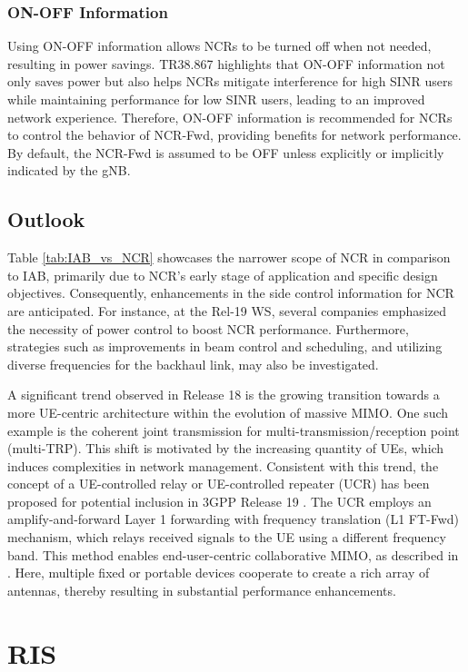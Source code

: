\documentclass[lettersize,journal]{IEEEtran}
\begin{document}
\subsubsection{ON-OFF Information}
Using ON-OFF information allows NCRs to be turned off when not needed, resulting in power savings. TR38.867 \cite{R1-2203237} highlights that ON-OFF information not only saves power but also helps NCRs mitigate interference for high SINR users while maintaining performance for low SINR users, leading to an improved network experience. Therefore, ON-OFF information is recommended for NCRs to control the behavior of NCR-Fwd, providing benefits for network performance. By default, the NCR-Fwd is assumed to be OFF unless explicitly or implicitly indicated by the gNB.


\subsection{Outlook}

Table \ref{tab:IAB_vs_NCR} showcases the narrower scope of NCR in comparison to IAB, primarily due to NCR's early stage of application and specific design objectives. Consequently, enhancements in the side control information for NCR are anticipated. For instance, at the Rel-19 WS, several companies emphasized the necessity of power control to boost NCR performance. Furthermore, strategies such as improvements in beam control and scheduling, and utilizing diverse frequencies for the backhaul link, may also be investigated.

A significant trend observed in Release 18 is the growing transition towards a more UE-centric architecture within the evolution of massive MIMO. One such example is the coherent joint transmission for multi-transmission/reception point (multi-TRP). This shift is motivated by the increasing quantity of UEs, which induces complexities in network management. Consistent with this trend, the concept of a UE-controlled relay or UE-controlled repeater (UCR) has been proposed for potential inclusion in 3GPP Release 19 \cite{RWS-230111}. The UCR employs an amplify-and-forward Layer 1 forwarding with frequency translation (L1 FT-Fwd) mechanism, which relays received signals to the UE using a different frequency band. This method enables end-user-centric collaborative MIMO, as described in \cite{Tsai-TAP22}. Here, multiple fixed or portable devices cooperate to create a rich array of antennas, thereby resulting in substantial performance enhancements.

\section{RIS}
\end{document}
